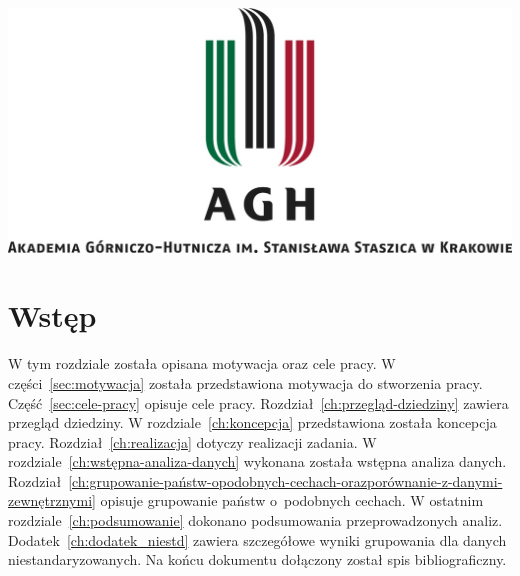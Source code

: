 \documentclass[11pt]{report}
\begin{document}
    \begin{titlepage}
        \centering
        \includegraphics[width=\linewidth]{fig/AGH.jpg}
        \vspace{0.03\textheight}
        \bigskip
        \vspace{0.2\textheight}
        \par

        \vspace{0.1\textheight}
    \end{titlepage}

    \tableofcontents


    \chapter{Wstęp}

    W tym rozdziale została opisana motywacja oraz cele pracy.
    W części~\ref{sec:motywacja} została przedstawiona motywacja do stworzenia pracy.
    Część~\ref{sec:cele-pracy} opisuje cele pracy.
    Rozdział~\ref{ch:przegląd-dziedziny} zawiera przegląd dziedziny.
    W rozdziale~\ref{ch:koncepcja} przedstawiona została koncepcja pracy.
    Rozdział~\ref{ch:realizacja} dotyczy realizacji zadania.
    W rozdziale~\ref{ch:wstępna-analiza-danych} wykonana została wstępna analiza danych.
    Rozdział~\ref{ch:grupowanie-państw-opodobnych-cechach-orazporównanie-z-danymi-zewnętrznymi} opisuje grupowanie państw o~podobnych cechach.
    W ostatnim rozdziale~\ref{ch:podsumowanie} dokonano podsumowania przeprowadzonych analiz.
    Dodatek~\ref{ch:dodatek_niestd} zawiera szczegółowe wyniki grupowania dla danych niestandaryzowanych.
    Na końcu dokumentu dołączony został spis bibliograficzny.
\end{document}
